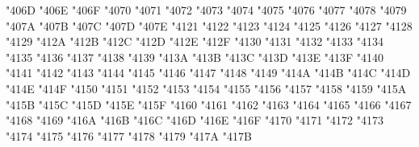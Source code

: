 {\Uchar\jis"406D %
\Uchar\jis"406E %
\Uchar\jis"406F %
\Uchar\jis"4070 %
\Uchar\jis"4071 %
\Uchar\jis"4072 %
\Uchar\jis"4073 %
\Uchar\jis"4074 %
\Uchar\jis"4075 %
\Uchar\jis"4076 %
\Uchar\jis"4077 %
\Uchar\jis"4078 %
\Uchar\jis"4079 %
\Uchar\jis"407A %
\Uchar\jis"407B %
\Uchar\jis"407C %
\Uchar\jis"407D %
\Uchar\jis"407E %
\Uchar\jis"4121 %
\Uchar\jis"4122 %
\Uchar\jis"4123 %
\Uchar\jis"4124 %
\Uchar\jis"4125 %
\Uchar\jis"4126 %
\Uchar\jis"4127 %
\Uchar\jis"4128 %
\Uchar\jis"4129 %
\Uchar\jis"412A %
\Uchar\jis"412B %
\Uchar\jis"412C %
\Uchar\jis"412D %
\Uchar\jis"412E %
\Uchar\jis"412F %
\Uchar\jis"4130 %
\Uchar\jis"4131 %
\Uchar\jis"4132 %
\Uchar\jis"4133 %
\Uchar\jis"4134 %
\Uchar\jis"4135 %
\Uchar\jis"4136 %
\Uchar\jis"4137 %
\Uchar\jis"4138 %
\Uchar\jis"4139 %
\Uchar\jis"413A %
\Uchar\jis"413B %
\Uchar\jis"413C %
\Uchar\jis"413D %
\Uchar\jis"413E %
\Uchar\jis"413F %
\Uchar\jis"4140 %
\Uchar\jis"4141 %
\Uchar\jis"4142 %
\Uchar\jis"4143 %
\Uchar\jis"4144 %
\Uchar\jis"4145 %
\Uchar\jis"4146 %
\Uchar\jis"4147 %
\Uchar\jis"4148 %
\Uchar\jis"4149 %
\Uchar\jis"414A %
\Uchar\jis"414B %
\Uchar\jis"414C %
\Uchar\jis"414D %
\Uchar\jis"414E %
\Uchar\jis"414F %
\Uchar\jis"4150 %
\Uchar\jis"4151 %
\Uchar\jis"4152 %
\Uchar\jis"4153 %
\Uchar\jis"4154 %
\Uchar\jis"4155 %
\Uchar\jis"4156 %
\Uchar\jis"4157 %
\Uchar\jis"4158 %
\Uchar\jis"4159 %
\Uchar\jis"415A %
\Uchar\jis"415B %
\Uchar\jis"415C %
\Uchar\jis"415D %
\Uchar\jis"415E %
\Uchar\jis"415F %
\Uchar\jis"4160 %
\Uchar\jis"4161 %
\Uchar\jis"4162 %
\Uchar\jis"4163 %
\Uchar\jis"4164 %
\Uchar\jis"4165 %
\Uchar\jis"4166 %
\Uchar\jis"4167 %
\Uchar\jis"4168 %
\Uchar\jis"4169 %
\Uchar\jis"416A %
\Uchar\jis"416B %
\Uchar\jis"416C %
\Uchar\jis"416D %
\Uchar\jis"416E %
\Uchar\jis"416F %
\Uchar\jis"4170 %
\Uchar\jis"4171 %
\Uchar\jis"4172 %
\Uchar\jis"4173 %
\Uchar\jis"4174 %
\Uchar\jis"4175 %
\Uchar\jis"4176 %
\Uchar\jis"4177 %
\Uchar\jis"4178 %
\Uchar\jis"4179 %
\Uchar\jis"417A %
\Uchar\jis"417B %
}
